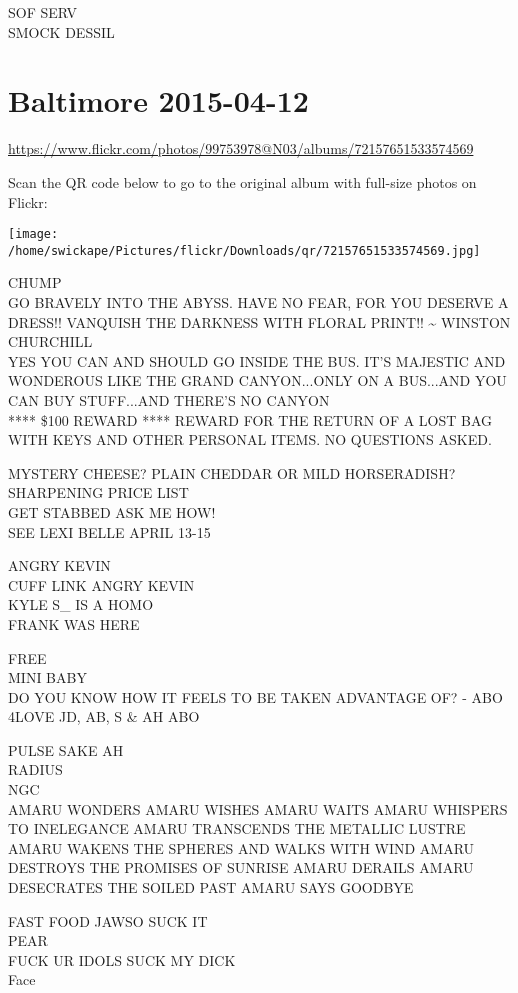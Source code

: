 \documentclass[10pt,letterpaper]{article}
\begin{document}
SOF SERV\\
SMOCK DESSIL


\section*{Baltimore 2015-04-12}

\url{https://www.flickr.com/photos/99753978@N03/albums/72157651533574569}

Scan the QR code below to go to the original album with full-size photos on Flickr:

\texttt{[image: /home/swickape/Pictures/flickr/Downloads/qr/72157651533574569.jpg]}


CHUMP\\
GO BRAVELY INTO THE ABYSS.  HAVE NO FEAR, FOR YOU DESERVE A DRESS!!  VANQUISH THE DARKNESS WITH FLORAL PRINT!!  \textasciitilde{} WINSTON CHURCHILL\\
YES YOU CAN AND SHOULD GO INSIDE THE BUS.  IT'S MAJESTIC AND WONDEROUS LIKE THE GRAND CANYON...ONLY ON A BUS...AND YOU CAN BUY STUFF...AND THERE'S NO CANYON\\
**** \$100 REWARD **** REWARD FOR THE RETURN OF A LOST BAG WITH KEYS AND OTHER PERSONAL ITEMS.  NO QUESTIONS ASKED.

MYSTERY CHEESE?  PLAIN CHEDDAR OR MILD HORSERADISH?\\
SHARPENING PRICE LIST\\
GET STABBED ASK ME HOW!\\
SEE LEXI BELLE APRIL 13{-}15

ANGRY KEVIN\\
CUFF LINK ANGRY KEVIN\\
KYLE S\_ IS A HOMO\\
FRANK WAS HERE

FREE\\
MINI BABY\\
DO YOU KNOW HOW IT FEELS TO BE TAKEN ADVANTAGE OF? {-} ABO\\
4LOVE JD, AB, S \& AH ABO

PULSE SAKE AH\\
RADIUS\\
NGC\\
AMARU WONDERS AMARU WISHES AMARU WAITS AMARU WHISPERS TO INELEGANCE AMARU TRANSCENDS THE METALLIC LUSTRE AMARU WAKENS THE SPHERES AND WALKS WITH WIND AMARU DESTROYS THE PROMISES OF SUNRISE AMARU DERAILS AMARU DESECRATES THE SOILED PAST AMARU SAYS GOODBYE

FAST FOOD JAWSO SUCK IT\\
PEAR\\
FUCK UR IDOLS SUCK MY DICK\\
Face
\end{document}

